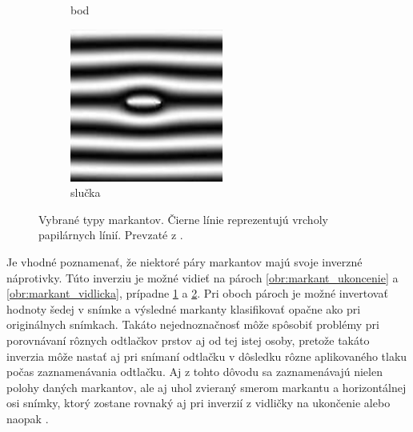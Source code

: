 \begin{figure}[h]
\begin{subfigure}[b]{0.19\linewidth}
      \caption{bod}
      \label{obr:markant_bod}
    \end{subfigure}
    \hfill
    \begin{subfigure}[b]{0.19\linewidth}
      \includegraphics[width=\linewidth]{obrazky-figures/markanty/slucka.png}
      \caption{slučka}
      \label{obr:markant_slucka}
    \end{subfigure}
    \caption{Vybrané typy markantov. Čierne línie reprezentujú vrcholy papilárnych línií. Prevzaté z \cite{Drahansky}.}
    \label{obr:typy_markantov}
  \end{figure}

  Je vhodné poznamenať, že niektoré páry markantov majú svoje inverzné náprotivky. Túto inverziu je možné vidieť na pároch
  \ref{obr:markant_ukoncenie} a \ref{obr:markant_vidlicka}, prípadne \ref{obr:markant_bod} a \ref{obr:markant_slucka}. Pri oboch pároch je možné invertovať
  hodnoty šedej v snímke a výsledné markanty klasifikovať opačne ako pri originálnych snímkach. Takáto nejednoznačnosť môže spôsobiť problémy pri porovnávaní
  rôznych odtlačkov prstov aj od tej istej osoby, pretože takáto inverzia môže nastať aj pri snímaní odtlačku v dôsledku rôzne aplikovaného tlaku počas
  zaznamenávania odtlačku. Aj z tohto dôvodu sa zaznamenávajú nielen polohy daných markantov, ale aj uhol zvieraný smerom markantu a horizontálnej osi
  snímky, ktorý zostane rovnaký aj pri inverzií z vidličky na ukončenie alebo naopak \cite{Handbook}.

